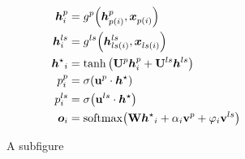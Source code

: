 \begin{figure}[ht]
	\centering
	\begin{subfigure}{.5\textwidth}
		\centering

		\begin{align*}
			\vh^\parent_i &= g^\parent{\left( \vh^\parent_{\parent(i)}, 
			\vx^{}_{\parent(i)} \right)}
			\\
					\vh^\leftsib_i &= g^\leftsib{\left( \vh^\leftsib_{\leftsib(i)}, 
					\vx^{}_{\leftsib(i)} \right)}
			\\
					\hpred_i &= \tanh{\left(\rmU^\parent \vh^\parent_i + \rmU^\leftsib 
					\vh^\leftsib\right)}
			\\
						p^\parent_i &= \sigma{\left(\rvu^\parent \cdot \hpred \right)}
			\\
						p^\leftsib_i &= \sigma{\left(\rvu^\leftsib \cdot \hpred \right)}
			\\
						\vo_i &= \softmax{\left(\rmW\hpred_i + \alpha_i\rvv^\parent + 
						\varphi_i\rvv^\leftsib \right)}
			\\
		\end{align*}

		\caption{A subfigure}\label{fig:broken_1}
	\end{subfigure}%
	\begin{subfigure}{.5\textwidth}
		\centering


		\begin{tikzpicture}[scale=0.7,x=0.75pt,y=0.75pt,yscale=-1,xscale=1]


\end{tikzpicture}
\end{subfigure}
\end{figure}
